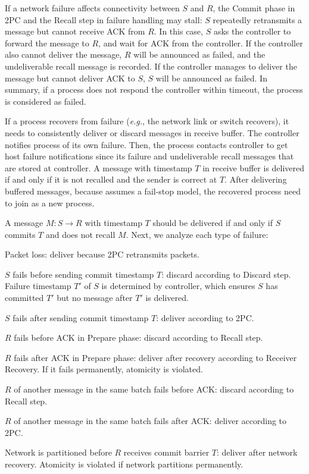  If a network failure affects connectivity between $S$ and $R$, the Commit phase in 2PC and the Recall step in failure handling may stall: $S$ repeatedly retransmits a message but cannot receive ACK from $R$. In this case, $S$ asks the controller to forward the message to $R$, and wait for ACK from the controller. If the controller also cannot deliver the message, $R$ will be announced as failed, and the undeliverable recall message is recorded. If the controller manages to deliver the message but cannot deliver ACK to $S$, $S$ will be announced as failed. In summary, if a process does not respond the controller within timeout, the process is considered as failed.

 If a process recovers from failure (\emph{e.g.}, the network link or switch recovers), it needs to consistently deliver or discard messages in receive buffer. The controller notifies process of its own failure. Then, the process contacts controller to get host failure notifications since its failure and undeliverable recall messages that are stored at controller. A message with timestamp $T$ in receive buffer is delivered if and only if it is not recalled and the sender is correct at $T$. After delivering buffered messages, because \sys{} assumes a fail-stop model, the recovered process need to join \sys{} as a new process.

A message $M: S \rightarrow R$ with timestamp $T$ should be delivered if and only if $S$ commits $T$ and does not recall $M$. Next, we analyze each type of failure:
\begin{ecompact}
\item Packet loss: deliver because 2PC retransmits packets.
\item $S$ fails before sending commit timestamp $T$: discard according to Discard step. Failure timestamp $T'$ of $S$ is determined by controller, which ensures $S$ has committed $T'$ but no message after $T'$ is delivered.
\item $S$ fails after sending commit timestamp $T$: deliver according to 2PC.
\item $R$ fails before ACK in Prepare phase: discard according to Recall step.
\item $R$ fails after ACK in Prepare phase: deliver after recovery according to Receiver Recovery. If it fails permanently, atomicity is violated.
\item $R$ of another message in the same batch fails before ACK: discard according to Recall step.
\item $R$ of another message in the same batch fails after ACK: deliver according to 2PC.
\item Network is partitioned before $R$ receives commit barrier $T$: deliver after network recovery. Atomicity is violated if network partitions permanently.
\end{ecompact}

